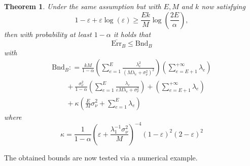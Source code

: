 \documentclass[10pt,twocolumn,twoside]{IEEEtran}					%
\newcounter{generalCounter}
\theoremstyle	{plain}
\newtheorem		{theorem}		[generalCounter]	{Theorem}
\newcommand{\DefinedAs}			[0]	{\mathrel{\mathop:}=}
\begin{document}
\begin{theorem}
	Under the same assumption but with $E, M$ and $k$ now satisfying
	\begin{equation}
		1 - \varepsilon + \varepsilon \log(\varepsilon)
		\geq
		\frac{Ek}{M} \log\left(\frac{2 E}{\alpha}\right),
		\label{equ:condition_on_varepsilon_for_estimator_B}
	\end{equation}
	then with probability at least $1-\alpha$ it holds that
	\begin{equation}
		\overline{\mathrm{Err}}_{B}
		\leq
		\mathrm{Bnd}_{B}
		\label{equ:definition_of_bound_B}
	\end{equation}
	with
	\begin{equation}
		\begin{array}{l}
			\displaystyle
			\mathrm{Bnd}_{B}
			\DefinedAs
			\frac{k M}{1 - \alpha}
			\left(
				\sum_{e = 1}^{E} \frac{\lambda_{e}^{2}}{\left( M \lambda_{e} + \sigma^{2}_{\nu} \right)^{2}}
			\right)
			\left( \sum_{e = E + 1}^{+\infty} \lambda_{e} \right)
			\\ \qquad \displaystyle
			+
			\frac{\sigma^{2}_{\nu}}{1-\alpha}
			\left(
				\sum_{e = 1}^{E}
				\frac{\lambda_e}{\varepsilon M \lambda_e + \sigma^{2}_{\nu}}
			\right)
			+
			\left(
				\sum_{e = E + 1}^{+\infty} \lambda_{e}
			\right)
			\\ \qquad \displaystyle
			+
			\kappa
			\left(
				\frac{E}{M}
				\sigma_{\nu}^{2}
				+
				\sum_{e = 1}^{E} \lambda_{e}
			\right)
		\end{array}
		\label{equ:value_of_bound_B}
	\end{equation}
	where
	\begin{equation}
		\kappa
		=
		\frac{1}{1-\alpha}
		\left( \varepsilon + \frac{\lambda_1^{-1} \sigma_{\nu}^2}{M} \right)^{-4}
		(1-\varepsilon)^2 (2-\varepsilon)^2
	\label{equ:definition_of_kappa}
	\end{equation}
\label{thm:bounds_on_errors_of_f_A_and_f_B}
\end{theorem}

The obtained bounds are now tested via a numerical example.
\end{document}
